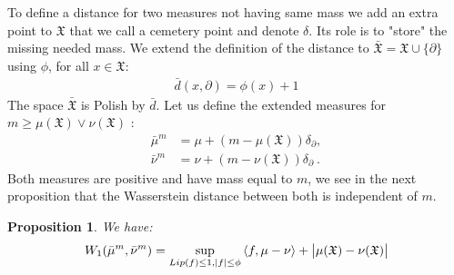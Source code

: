 \documentclass[11pt,a4paper]{article}
\newcommand{\XF}{\mathfrak{X}}
\newcommand{\brac}[1]{\left\langle#1\right\rangle}
\newtheorem{proposition}[theorem]{Proposition}
\begin{document}
To define a distance for two measures not having same mass we add an extra point to $\XF$ that we call a cemetery point and denote $\delta$. Its role is to "store" the missing needed mass. We extend the definition of the distance to $\bar{\XF} = \XF\cup \lbrace\partial\rbrace$ using $\phi$, for all $x \in \XF$:
\begin{align*}
    \bar{d}(x,\partial) = \phi(x) + 1
\end{align*}
The space $\bar{\XF}$ is Polish by $\bar{d}$. Let us define the extended measures for $m\geq \mu(\XF) \vee \nu(\XF)$ :
\begin{align*}
    \bar{\mu}^m &= \mu + (m-\mu(\XF))\delta_{\partial}, \\
    \bar{\nu}^m &= \nu + (m-\nu(\XF))\delta_{\partial}\ .
\end{align*}
Both measures are positive and have mass equal to $m$, we see in the next proposition that the Wasserstein distance between both is independent of $m$.
\begin{proposition}\label{prop:Kantorovich-general}
    We have:
    \begin{align*}
        W_1(\bar{\mu}^m,\bar{\nu}^m) = \sup\limits_{Lip(f) \leq 1, |f| \leq \phi} \brac{f,\mu - \nu} + \left|\vphantom{A^2}\mu(\XF) - \nu(\XF) \right|
    \end{align*}
\end{proposition}
\end{document}
